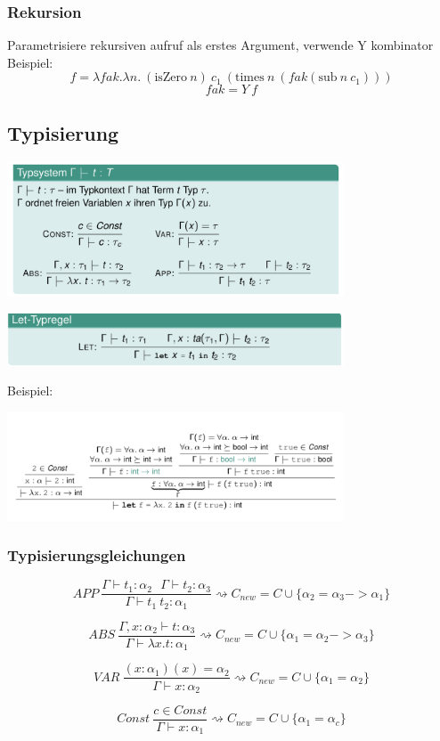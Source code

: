 \subsubsection{Rekursion}
Parametrisiere rekursiven aufruf als erstes Argument, verwende Y kombinator\\
Beispiel:\\
$$f = \lambda fak. \lambda n. \medspace (\text{isZero}\medspace n)  \medspace c_1 \medspace (\text{times} \medspace n \medspace (fak (\text{sub}\medspace n \medspace c_1)))$$
$$fak = Y \medspace f$$

\subsection{Typisierung}
\begin{center}
	\includegraphics[width=0.75\textwidth]{images/types.png}	
\end{center}
\begin{center}
		\includegraphics[width=0.75\textwidth]{images/let.png}
\end{center}
Beispiel:\\
\begin{center}
	\includegraphics[width=0.75\textwidth]{images/let_ex.png}
\end{center}
\subsubsection{Typisierungsgleichungen}
$$APP \medspace\frac{\Gamma \vdash t_1 : \alpha_2 \medspace\medspace\medspace \Gamma \vdash t_2 : \alpha_3}{\Gamma \vdash t_1 \medspace t_2 : \alpha_1} \rightsquigarrow C_{new} = C \cup \{\alpha_2 = \alpha_3 -> \alpha_1\}$$

$$ABS \medspace\frac{\Gamma, x : \alpha_2 \vdash t : \alpha_3}{\Gamma \vdash \lambda x.t:\alpha_1} \rightsquigarrow C_{new} = C \cup \{\alpha_1 = \alpha_2 -> \alpha_3\}$$

$$VAR \medspace\frac{(x: \alpha_1)(x) = \alpha_2}{\Gamma \vdash x : \alpha_2} \rightsquigarrow C_{new} = C \cup \{\alpha_1 = \alpha_2\}$$

$$Const \medspace\frac{c \in Const}{\Gamma \vdash x : \alpha_1} \rightsquigarrow C_{new} = C \cup \{\alpha_1 = \alpha_c\}$$